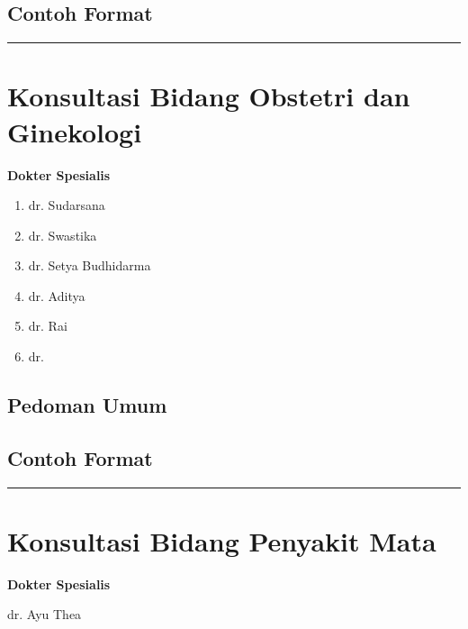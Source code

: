 \documentclass[
]{book}
\providecommand{\tightlist}{%
  \setlength{\itemsep}{0pt}\setlength{\parskip}{0pt}}
\begin{document}
\hypertarget{contoh-format-6}{%
\subsection{Contoh Format}\label{contoh-format-6}}

\begin{center}\rule{0.5\linewidth}{0.5pt}\end{center}

\hypertarget{konsultasi-bidang-obstetri-dan-ginekologi}{%
\section{Konsultasi Bidang Obstetri dan Ginekologi}\label{konsultasi-bidang-obstetri-dan-ginekologi}}

\textbf{Dokter Spesialis}

\begin{enumerate}
\def\labelenumi{\arabic{enumi}.}
\tightlist
\item
  dr. Sudarsana
\item
  dr. Swastika
\item
  dr. Setya Budhidarma
\item
  dr. Aditya
\item
  dr. Rai
\item
  dr.
\end{enumerate}

\hypertarget{pedoman-umum-7}{%
\subsection{Pedoman Umum}\label{pedoman-umum-7}}

\hypertarget{contoh-format-7}{%
\subsection{Contoh Format}\label{contoh-format-7}}

\begin{center}\rule{0.5\linewidth}{0.5pt}\end{center}

\hypertarget{konsultasi-bidang-penyakit-mata}{%
\section{Konsultasi Bidang Penyakit Mata}\label{konsultasi-bidang-penyakit-mata}}

\textbf{Dokter Spesialis}

dr. Ayu Thea
\end{document}
